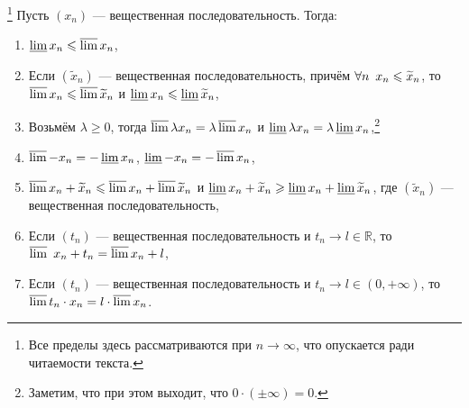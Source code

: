 \begin{theorem}\footnote{Все пределы здесь рассматриваются при \(n \to \infty\), что опускается ради читаемости текста.}
	Пусть \((x_n)\) --- вещественная последовательность. Тогда:
	\begin{enumerate}
		\item \(\varliminf x_n \leqslant \varlimsup x_n\),
		\item Если \((\widetilde{x}_n)\) --- вещественная последовательность, причём \(\forall n \enskip x_n \leqslant \widetilde{x}_n\), то \(\varlimsup x_n \leqslant \varlimsup \widetilde{x}_n\) и \(\varliminf x_n \leqslant \varliminf \widetilde{x}_n\),
		\item Возьмём \(\lambda \geqslant 0\), тогда \(\varlimsup \lambda x_n = \lambda \varlimsup x_n\) и \(\varliminf \lambda x_n = \lambda \varliminf x_n\),\footnote{Заметим, что при этом выходит, что \(0 \cdot (\pm \infty) = 0\).}
		\item \(\varlimsup -x_n = -\varliminf x_n\), \(\varliminf -x_n = -\varlimsup x_n\),
		\item \(\varlimsup x_n + \widetilde{x}_n \leqslant \varlimsup x_n + \varlimsup \widetilde{x}_n\) и \(\varliminf x_n + \widetilde{x}_n \geqslant \varliminf x_n + \varliminf \widetilde{x}_n\), где \((\widetilde{x}_n)\) --- вещественная последовательность,
		\item Если \((t_n)\) --- вещественная последовательность и \(t_n \to l \in \mathbb{R}\), то \(\varlimsup\ x_n + t_n = \varlimsup x_n + l\),
		\item Если \((t_n)\) --- вещественная последовательность и \(t_n \to l \in (0, +\infty)\), то \(\varlimsup t_n \cdot x_n = l \cdot \varlimsup x_n\).
	\end{enumerate}
\end{theorem}

